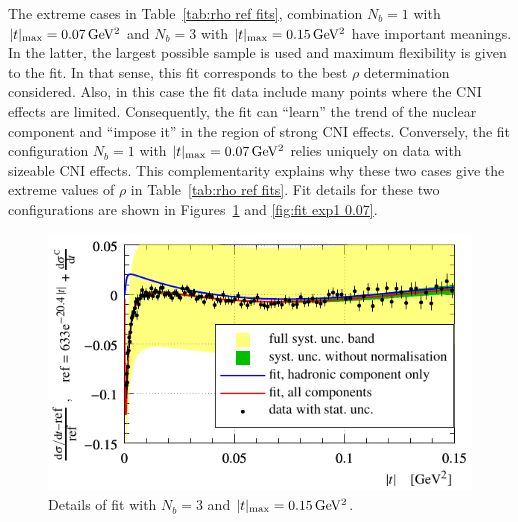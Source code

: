 The extreme cases in Table~\ref{tab:rho ref fits}, combination $N_b=1$ with $|t|_{\rm max} = 0.07\,{\rm GeV^2}$ and $N_b=3$ with $|t|_{\rm max} = 0.15\,{\rm GeV^2}$ have important meanings. In the latter, the largest possible sample is used and maximum flexibility is given to the fit. In that sense, this fit corresponds to the best $\rho$ determination considered. Also, in this case the fit data include many points where the CNI effects are limited. Consequently, the fit can ``learn'' the trend of the nuclear component and ``impose it'' in the region of strong CNI effects. Conversely, the fit configuration $N_b=1$ with $|t|_{\rm max} = 0.07\,{\rm GeV^2}$ relies uniquely on data with sizeable CNI effects. This complementarity explains why these two cases give the extreme values of $\rho$ in Table~\ref{tab:rho ref fits}. Fit details for these two configurations are shown in Figures~\ref{fig:fit exp3 0.15} and \ref{fig:fit exp1 0.07}.


\begin{figure}
\vskip-5mm
\begin{center}
\includegraphics{fig/fit_details_exp3_0p15.pdf}
\vskip-2mm
\caption{%
Details of fit with $N_b = 3$ and $|t|_{\rm max} = 0.15\,{\rm GeV^2}$.
}
\label{fig:fit exp3 0.15}
\end{center}
\end{figure}



